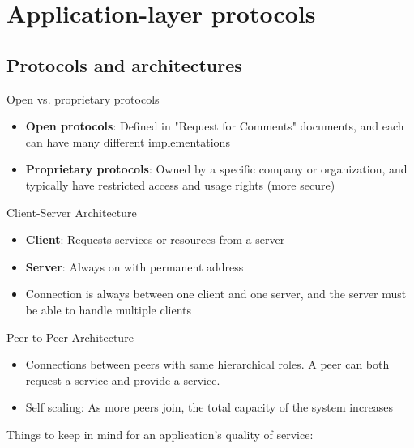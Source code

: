 \section{Application-layer protocols}

\subsection{Protocols and architectures}

\begin{knBox}
    {Open vs. proprietary protocols}
    \begin{itemize}
        \item \textbf{Open protocols}: Defined in "Request for Comments" documents, and each can have many different implementations
        \item \textbf{Proprietary protocols}: Owned by a specific company or organization, and typically have restricted access and usage rights (more secure)
    \end{itemize}
\end{knBox}

\begin{theorem}
    {Client-Server Architecture}

    \begin{itemize}
        \item \textbf{Client}: Requests services or resources from a server
        \item \textbf{Server}: Always on with permanent address
        \item Connection is always between one client and one server, and the server must be able to handle multiple clients
    \end{itemize}
\end{theorem}

\begin{theorem}
    {Peer-to-Peer Architecture}

    \begin{itemize}
        \item Connections between peers with same hierarchical roles. A peer can both request a service and provide a service.
        \item Self scaling: As more peers join, the total capacity of the system increases
    \end{itemize}
\end{theorem}

Things to keep in mind for an application's quality of service:

